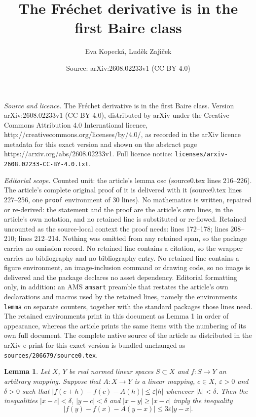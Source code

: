 \documentclass[10pt,a4paper]{amsart}
\title{The Fr\'echet derivative is in the first Baire class}
\author{Eva Kopeck\'a, Lud\v{e}k Zaj\'{\i}\v{c}ek}
\date{Source: arXiv:2608.02233v1 (CC BY 4.0)}
\newtheorem{lemma}{Lemma}
\newcommand{\ep}{\varepsilon}
\begin{document}
\maketitle

\noindent\emph{Source and licence.} The Fr\'echet derivative is in the first Baire class. Version arXiv:2608.02233v1 (CC BY 4.0), distributed by arXiv under the Creative Commons Attribution 4.0 International licence, http://creativecommons.org/licenses/by/4.0/, as recorded in the arXiv licence metadata for this exact version and shown on the abstract page https://arxiv.org/abs/2608.02233v1. Full licence notice: \texttt{licenses/arxiv-2608.02233-CC-BY-4.0.txt}.\par\smallskip

\noindent\textit{Editorial scope.} Counted unit: the article's lemma osc (source0.tex lines 216--226). The article's complete original proof of it is delivered with it (source0.tex lines 227--256, one \texttt{proof} environment of 30 lines). No mathematics is written, repaired or re-derived: the statement and the proof are the article's own lines, in the article's own notation, and no retained line is substituted or re-flowed.  Retained uncounted as the source-local context the proof needs: lines 172--178; lines 208--210; lines 212--214.  Nothing was omitted from any retained span, so the package carries no omission record.  No retained line contains a citation, so the wrapper carries no bibliography and no bibliography entry.  No retained line contains a figure environment, an image-inclusion command or drawing code, so no image is delivered and the package declares no asset dependency.  Editorial formatting only, in addition: an AMS \texttt{amsart} preamble that restates the article's own declarations and macros used by the retained lines, namely the environments \texttt{lemma} on separate counters, together with the standard packages those lines need.  The retained environments print in this document as Lemma 1 in order of appearance, whereas the article prints the same items with the numbering of its own full document.  The complete native source of the article as distributed in the arXiv e-print for this exact version is bundled unchanged as \texttt{sources/206679/source0.tex}.
\begin{lemma}\label{zah} 
Let $X$, $Y$ be real normed linear spaces  $S\subset X$ and $f:S \to Y$ an arbitrary mapping. Suppose that
 $A:X \to Y$ is a linear mapping, $c\in X$, $\ep>0$ and $\delta>0$ such that
 $|f(c+h)-f(c)- A(h)| \leq \ep |h|$ whenever $|h|< \delta$. Then the inequalities $|x-c|< \delta$,
 $|y-c|< \delta$ and $|x-y|\geq |x-c|$ imply the inequality
$$   |f(y)-f(x)- A(y- x)| \leq 3\ep |y-x|. $$
\end{lemma}
\end{document}
